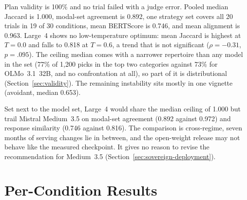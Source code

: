 Plan validity is 100\% and no trial failed with a judge error. Pooled median Jaccard is 1.000, modal-set agreement is 0.892, one strategy set covers all 20 trials in 19 of 30 conditions, mean BERTScore is 0.746, and mean alignment is 0.963. Large~4 shows no low-temperature optimum: mean Jaccard is highest at $T{=}0.0$ and falls to 0.818 at $T{=}0.6$, a trend that is not significant ($\rho=-0.31$, $p=.095$). The ceiling median comes with a narrower repertoire than any model in the set (77\% of 1{,}200 picks in the top two categories against 73\% for OLMo~3.1~32B, and no confrontation at all), so part of it is distributional (Section~\ref{sec:validity}). The remaining instability sits mostly in one vignette (avoidant, median 0.653).

Set next to the model set, Large~4 would share the median ceiling of 1.000 but trail Mistral Medium~3.5 on modal-set agreement (0.892 against 0.972) and response similarity (0.746 against 0.816). The comparison is cross-regime, seven months of serving changes lie in between, and the open-weight release may not behave like the measured checkpoint. It gives no reason to revise the recommendation for Medium~3.5 (Section~\ref{sec:sovereign-deployment}).

\section{Per-Condition Results}
\label{app:tables}


